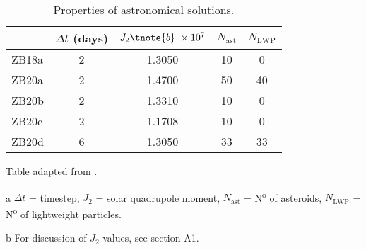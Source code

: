 \documentclass[draft]{agujournal2019}
\begin{document}

\begin{table}
\begin{threeparttable}
\caption{Properties of astronomical solutions.\label{tab:astronomical-solutions}}
\centering
\begin{tabular}{lcccc}
 & \(\Delta{}t\) (days) & \(J_{2}\tnote{b}~\times10^{7}\) & \(N_{\text{ast}}\) & \(N_{\text{LWP}}\) \\
\hline
ZB18a & 2 & \num{1.3050} & 10 & 0 \\
ZB20a & 2 & \num{1.4700} & 50 & 40 \\
ZB20b & 2 & \num{1.3310} & 10 & 0 \\
ZB20c & 2 & \num{1.1708} & 10 & 0 \\
ZB20d & 6 & \num{1.3050} & 33 & 33 \\
\end{tabular}
\begin{tablenotes}
  \item Table adapted from .
  \item [a] \(\Delta{}t\) = timestep, \(J_{2}\) = solar quadrupole moment, \(N_{\text{ast}}\) = N\textsuperscript{o} of asteroids, \(N_\text{LWP}\) = N\textsuperscript{o} of lightweight particles.
  \item [b] For discussion of \(J_{2}\) values, see  section A1.
\end{tablenotes}
\end{threeparttable}
\end{table}
\end{document}
